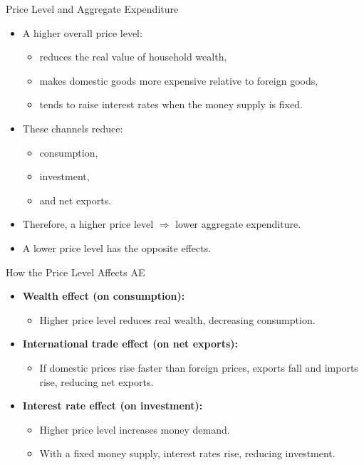 \documentclass[aspectratio=169]{beamer}
\begin{document}
\begin{frame}{Price Level and Aggregate Expenditure}
\transfade
\begin{itemize}[<+->]
  \item A higher overall price level:
  \begin{itemize}[<+->]
    \item reduces the real value of household wealth,
    \item makes domestic goods more expensive relative to foreign goods,
    \item tends to raise interest rates when the money supply is fixed.
  \end{itemize}
  \item These channels reduce:
  \begin{itemize}[<+->]
    \item consumption,
    \item investment,
    \item and net exports.
  \end{itemize}
  \item Therefore, a higher price level \(\Rightarrow\) lower aggregate expenditure.
  \item A lower price level has the opposite effects.
\end{itemize}
\end{frame}

\begin{frame}{How the Price Level Affects AE}
\transfade
\begin{itemize}[<+->]
  \item \textbf{Wealth effect (on consumption):}
  \begin{itemize}[<+->]
    \item Higher price level reduces real wealth, decreasing consumption.
  \end{itemize}
  \item \textbf{International trade effect (on net exports):}
  \begin{itemize}[<+->]
    \item If domestic prices rise faster than foreign prices, exports fall and imports rise, reducing net exports.
  \end{itemize}
  \item \textbf{Interest rate effect (on investment):}
  \begin{itemize}[<+->]
    \item Higher price level increases money demand.
    \item With a fixed money supply, interest rates rise, reducing investment.
  \end{itemize}
\end{itemize}
\end{frame}
\end{document}
